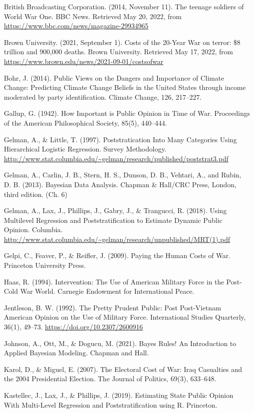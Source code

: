 \documentclass[
  11pt,
]{article}
\begin{document}
British Broadcasting Corporation. (2014, November 11). The teenage
soldiers of World War One. BBC News. Retrieved May 20, 2022, from
\url{https://www.bbc.com/news/magazine-29934965}

Brown University. (2021, September 1). Costs of the 20-Year War on
terror: \$8 trillion and 900,000 deaths. Brown University. Retrieved May
17, 2022, from \url{https://www.brown.edu/news/2021-09-01/costsofwar}

Bohr, J. (2014). Public Views on the Dangers and Importance of Climate
Change: Predicting Climate Change Beliefs in the United States through
income moderated by party identification. Climate Change, 126, 217--227.

Gallup, G. (1942). How Important is Public Opinion in Time of War.
Proceedings of the American Philosophical Society, 85(5), 440--444.

Gelman, A., \& Little, T. (1997). Poststratication Into Many Categories
Using Hierarchical Logistic Regression. Survey Methodology.
\url{http://www.stat.columbia.edu/~gelman/research/published/poststrat3.pdf}

Gelman, A., Carlin, J. B., Stern, H. S., Dunson, D. B., Vehtari, A., and
Rubin, D. B. (2013). Bayesian Data Analysis. Chapman \& Hall/CRC Press,
London, third edition. (Ch. 6)

Gelman, A., Lax, J., Phillips, J., Gabry, J., \& Trangucci, R. (2018).
Using Multilevel Regression and Poststratification to Estimate Dynamic
Public Opinion. Columbia.
\url{http://www.stat.columbia.edu/~gelman/research/unpublished/MRT(1).pdf}

Gelpi, C., Feaver, P., \& Reifler, J. (2009). Paying the Human Costs of
War. Princeton University Press.

Haas, R. (1994). Intervention: The Use of American Military Force in the
Post-Cold War World. Carnegie Endowment for International Peace.

Jentleson, B. W. (1992). The Pretty Prudent Public: Post Post-Vietnam
American Opinion on the Use of Military Force. International Studies
Quarterly, 36(1), 49--73. \url{https://doi.org/10.2307/2600916}

Johnson, A., Ott, M., \& Dogucu, M. (2021). Bayes Rules! An Introduction
to Applied Bayesian Modeling. Chapman and Hall.

Karol, D., \& Miguel, E. (2007). The Electoral Cost of War: Iraq
Casualties and the 2004 Presidential Election. The Journal of Politics,
69(3), 633--648.

Kastellec, J., Lax, J., \& Phillips, J. (2019). Estimating State Public
Opinion With Multi-Level Regression and Poststratification using R.
Princeton.
\end{document}
